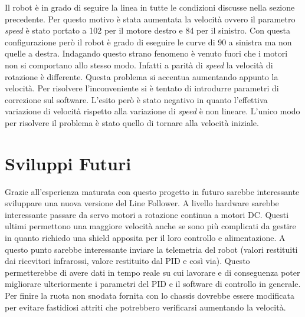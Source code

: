 \documentclass[twoside,twocolumn]{article}
\begin{document}
Il robot è in grado di seguire la linea in tutte le condizioni discusse nella sezione precedente. Per questo motivo è stata aumentata la velocità ovvero il parametro \textit{speed} è stato portato a 102 per il motore destro e 84 per il sinistro. Con questa configurazione però il robot è grado di eseguire le curve di 90 a sinistra ma non quelle a destra. Indagando questo strano fenomeno è venuto fuori che i motori non si comportano allo stesso modo. Infatti a parità di \textit{speed} la velocità di rotazione è differente. Questa problema si accentua aumentando appunto la velocità. Per risolvere l'inconveniente si è tentato di introdurre parametri di correzione sul software. L'esito però è stato negativo in quanto l'effettiva variazione di velocità rispetto alla variazione di \textit{speed} è non lineare. L'unico modo per risolvere il problema è stato quello di tornare alla velocità iniziale.

\section{Sviluppi Futuri}

Grazie all'esperienza maturata con questo progetto in futuro sarebbe interessante sviluppare una nuova versione del Line Follower. A livello hardware sarebbe interessante passare da servo motori a rotazione continua a motori DC. Questi ultimi permettono una maggiore velocità anche se sono più complicati da gestire in quanto richiedo una shield apposita per il loro controllo e alimentazione.
A questo punto sarebbe interessante inviare la telemetria del robot (valori restituiti dai ricevitori infrarossi, valore restituito dal PID e così via). Questo permetterebbe di avere dati in tempo reale su cui lavorare e di conseguenza poter migliorare ulteriormente i parametri del PID e il software di controllo in generale.
Per finire la ruota non snodata fornita con lo chassis dovrebbe essere modificata per evitare fastidiosi attriti che potrebbero verificarsi aumentando la velocità.
\end{document}

